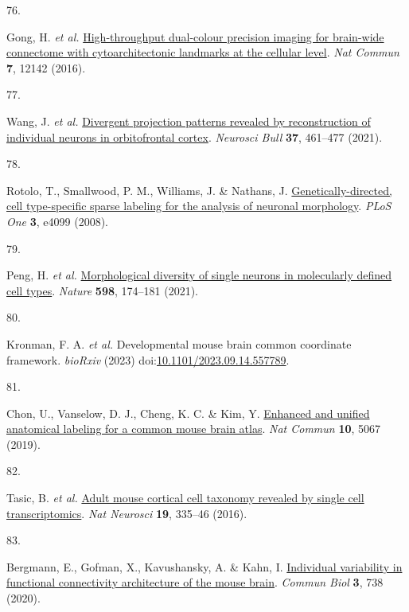 \documentclass[
  12pt,
]{article}
\newlength{\cslhangindent}
\newlength{\csllabelwidth}
\newenvironment{CSLReferences}[2] %
 {\begin{list}{}{%
  \setlength{\itemindent}{0pt}
  \setlength{\leftmargin}{0pt}
  \setlength{\parsep}{0pt}
  \ifodd #1
   \setlength{\leftmargin}{\cslhangindent}
   \setlength{\itemindent}{-1\cslhangindent}
  \fi
  \setlength{\itemsep}{#2\baselineskip}}}
 {\end{list}}
\newcommand{\CSLLeftMargin}[1]{\parbox[t]{\csllabelwidth}{\strut#1\strut}}
\newcommand{\CSLRightInline}[1]{\parbox[t]{\linewidth - \csllabelwidth}{\strut#1\strut}}
\begin{document}
\begin{CSLReferences}{0}{0}
\CSLLeftMargin{76. }%
\CSLRightInline{Gong, H. \emph{et al.}
\href{https://doi.org/10.1038/ncomms12142}{High-throughput dual-colour
precision imaging for brain-wide connectome with cytoarchitectonic
landmarks at the cellular level}. \emph{Nat Commun} \textbf{7}, 12142
(2016).}

\CSLLeftMargin{77. }%
\CSLRightInline{Wang, J. \emph{et al.}
\href{https://doi.org/10.1007/s12264-020-00616-1}{Divergent projection
patterns revealed by reconstruction of individual neurons in
orbitofrontal cortex}. \emph{Neurosci Bull} \textbf{37}, 461--477
(2021).}

\CSLLeftMargin{78. }%
\CSLRightInline{Rotolo, T., Smallwood, P. M., Williams, J. \& Nathans,
J.
\href{https://doi.org/10.1371/journal.pone.0004099}{Genetically-directed,
cell type-specific sparse labeling for the analysis of neuronal
morphology}. \emph{PLoS One} \textbf{3}, e4099 (2008).}

\CSLLeftMargin{79. }%
\CSLRightInline{Peng, H. \emph{et al.}
\href{https://doi.org/10.1038/s41586-021-03941-1}{Morphological
diversity of single neurons in molecularly defined cell types}.
\emph{Nature} \textbf{598}, 174--181 (2021).}

\CSLLeftMargin{80. }%
\CSLRightInline{Kronman, F. A. \emph{et al.} Developmental mouse brain
common coordinate framework. \emph{bioRxiv} (2023)
doi:\href{https://doi.org/10.1101/2023.09.14.557789}{10.1101/2023.09.14.557789}.}

\CSLLeftMargin{81. }%
\CSLRightInline{Chon, U., Vanselow, D. J., Cheng, K. C. \& Kim, Y.
\href{https://doi.org/10.1038/s41467-019-13057-w}{Enhanced and unified
anatomical labeling for a common mouse brain atlas}. \emph{Nat Commun}
\textbf{10}, 5067 (2019).}

\CSLLeftMargin{82. }%
\CSLRightInline{Tasic, B. \emph{et al.}
\href{https://doi.org/10.1038/nn.4216}{Adult mouse cortical cell
taxonomy revealed by single cell transcriptomics}. \emph{Nat Neurosci}
\textbf{19}, 335--46 (2016).}

\CSLLeftMargin{83. }%
\CSLRightInline{Bergmann, E., Gofman, X., Kavushansky, A. \& Kahn, I.
\href{https://doi.org/10.1038/s42003-020-01472-5}{Individual variability
in functional connectivity architecture of the mouse brain}.
\emph{Commun Biol} \textbf{3}, 738 (2020).}


\end{CSLReferences}
\end{document}
